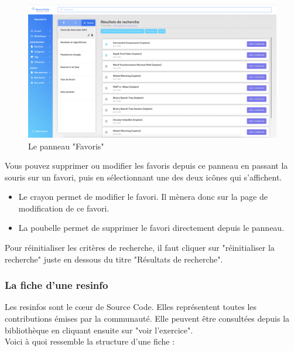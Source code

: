 \begin{figure}[H]
    \includegraphics[width=\textwidth,height=\textheight,keepaspectratio]{images/client/favorite-panel.png}
    \centering
    \caption[SourceCode : le panneau "Favoris"]{Le panneau "Favoris"}
\end{figure}

Vous pouvez supprimer ou modifier les favoris depuis ce panneau en passant la souris sur un favori, puis en sélectionnant une des deux icônes qui s'affichent.

\begin{itemize}
    \item Le crayon permet de modifier le favori. Il mènera donc sur la page de modification de ce favori.
    \item La poubelle permet de supprimer le favori directement depuis le panneau.
\end{itemize}

Pour réinitialiser les critères de recherche, il faut cliquer sur "réinitialiser la recherche" juste en dessous du titre "Résultats de recherche".\\

\subsubsection{La \gls{fiche} d’une \gls{resinfo}}

Les \glspl{resinfo} sont le cœur de Source Code. Elles représentent toutes les contributions émises par la communauté. Elle peuvent être consultées depuis la bibliothèque en cliquant ensuite sur "voir l'exercice".\\

Voici à quoi ressemble la structure d'une \gls{fiche} :

